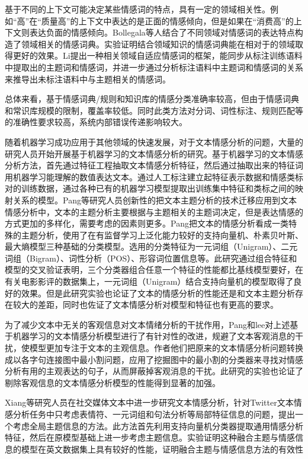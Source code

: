 基于不同的上下文可能决定某些情感词的特点，具有一定的领域相关性。例如“高”在“质量高”的上下文中表达的是正面的情感倾向，但是如果在“消费高”的上下文则表达负面的情感倾向。Bollegala等人结合了不同领域对情感词的表达特点构造了领域相关的情感词典。实验证明结合领域知识的情感词典能在相对于的领域取得更好的效果。Li提出一种相关领域自适应情感词的框架，能同步从标注训练语料中提取出的主题词和情感词，并进一步通过分析标注语料中主题词和情感词的关系来推导出未标注语料中与主题相关的情感词。

总体来看，基于情感词典/规则和知识库的情感分类准确率较高，但由于情感词典和常识库规模的限制，覆盖率较低。同时此类方法对分词、词性标注、规则匹配等的准确性要求较高，系统内部错误传递影响较大。


随着机器学习成功应用于其他领域的快速发展，对于文本情感分析的问题，大量的研究人员开始开展基于机器学习的文本情感分析的研究。基于机器学习的文本情感分析方法，首先通过特征工程抽取文本情感分析特征，然后通过抽取出来的特征词用机器学习能理解的数值表达文本。通过人工标注建立起特征表示数据和情感类标对的训练数据，通过各种已有的机器学习模型提取出训练集中特征和类标之间的映射关系的模型。Pang等研究人员创新性的把文本主题分析的技术迁移应用到文本情感分析中，文本的主题分析主要根据与主题相关的主题词决定，但是表达情感的方式更加的多样化，需要考虑的因素则更多。Pang把文本的情感分析看成一类特殊的主题分析，使用了在有监督学习上泛化能力较好的支持向量机、朴素贝叶斯、最大熵模型三种基础的分类模型。选用的分类特征为一元词组（Unigram）、二元词组（Bigram）、词性分析（POS）、形容词位置信息等。此研究通过组合特征和模型的交叉验证表明，三个分类器组合任意一个特征的性能都比基线模型要好，在有关电影影评的数据集上，一元词组（Unigram）结合支持向量机的模型取得了良好的效果。但是此研究实验也论证了文本的情感分析的性能还是和文本主题分析存在较大的差距，同时也佐证了文本情感分析对模型和特征也有更高的要求。

为了减少文本中无关的客观信息对文本情绪分析的干扰作用，Pang和lee对上述基于机器学习的文本情感分析模型进行了有针对性的改进，规避了文本客观消息的干扰，使模型更加专注于文本的主观信息。作者他们把原来的文本情感分析问题转换成以各字句连接图中最小割问题，应用了挖掘图中的最小割的分类器来寻找对情感分析有用的主观表达的句子，从而屏蔽掉客观消息的干扰。此研究的实验也论证了剔除客观信息的文本情感分析模型的性能得到显著的加强。

Xiang等研究人员在社交媒体文本中进一步研究文本情感分析，针对Twitter文本情感分析任务中只考虑表情符、一元词组和句法分析等局部特征信息的问题，提出一个考虑全局主题信息的方法。此方法首先利用支持向量机分类器提取通用情感分析特征，然后在原模型基础上进一步考虑主题信息。实验证明这种融合主题与情感信息的模型在英文数据集上具有较好的性能，证明融合主题与情感信息方法的有效性

